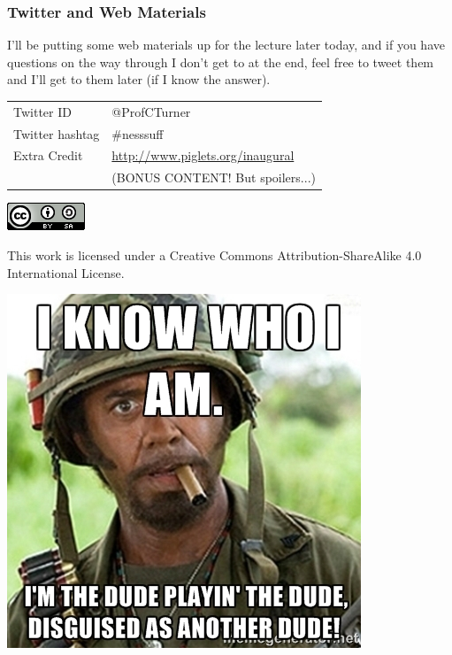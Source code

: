 \documentclass{beamer}
\begin{document}
\begin{frame}
  \frametitle{Twitter and Web Materials}

I'll be putting some web materials up for the lecture later today, and if you have questions on the way through I don't get to at the end, feel free to tweet them and I'll get to them later (if I know the answer).
  
  \medskip

  \begin{tabular}{ll}
  Twitter ID & @ProfCTurner \\
  Twitter hashtag & \#nesssuff \\
  Extra Credit & \url{http://www.piglets.org/inaugural} \\
  & (BONUS CONTENT! But spoilers...) \\
  \end{tabular}  
  
  \medskip
  \begin{center}
  \includegraphics[scale=0.5]{png/cc4.png}
  
  This work is licensed under a Creative Commons Attribution-ShareAlike 4.0 International License.  
  \end{center}    
\end{frame}


\begin{frame}
  
  \begin{center}
  \includegraphics[width=6.5 cm]{png/iknowwhoiam.jpg}
  \end{center}
\end{frame}
\end{document}
